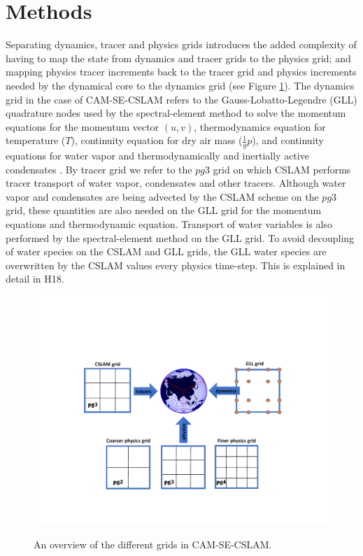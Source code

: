 \documentclass[draft,linenumbers]{agujournal}
\begin{document}
\section{Methods}\label{sec:methods}

Separating dynamics, tracer and physics grids introduces the added complexity of having to map the state from dynamics and tracer grids to the physics grid; and mapping physics tracer increments back to the tracer grid and physics increments needed by the dynamical core to the dynamics grid (see Figure \ref{fig:overview}). The dynamics grid in the case of CAM-SE-CSLAM refers to the Gauss-Lobatto-Legendre (GLL) quadrature nodes used by the spectral-element method to solve the momentum equations for the momentum vector $(u,v)$, thermodynamics equation for temperature ($T$), continuity equation for dry air mass ($\frac{1}{g}p$), and continuity equations for water vapor and thermodynamically and inertially active condensates \citep[see, e.g., ][ for details]{LetAl2018JAMES}. By tracer grid we refer to the $pg3$ grid on which CSLAM performs tracer transport of water vapor, condensates and other tracers. Although water vapor and condensates are being advected by the CSLAM scheme on the $pg3$ grid, these quantities are also needed on the GLL grid for the momentum equations and thermodynamic equation. Transport of water variables is also performed by the spectral-element method on the GLL grid. To avoid decoupling of water species on the CSLAM and GLL grids, the GLL water species are overwritten by the CSLAM values every physics time-step. This is explained in detail in H18.

\begin{figure}[t]
\begin{center}
\noindent\includegraphics[width=30pc,angle=0]{fig-overview.pdf}\\
\end{center}
\caption{An overview of the different grids in CAM-SE-CSLAM.}
\label{fig:overview}
\end{figure}
\end{document}
